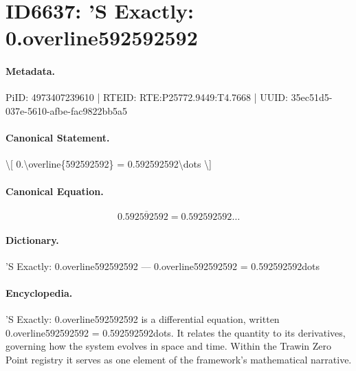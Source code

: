 \section*{ID6637: ’S Exactly: 0.overline592592592}
\paragraph{Metadata.}
PiID: 4973407239610 | RTEID: RTE:P25772.9449:T4.7668 | UUID: 35ec51d5-037e-5610-afbe-fac9822bb5a5

\paragraph{Canonical Statement.}
\textbackslash{}[ 0.\textbackslash{}overline\{592592592\} = 0.592592592\textbackslash{}dots \textbackslash{}]

\paragraph{Canonical Equation.}
\[
0.\overline{592592592} = 0.592592592\dots
\]

\paragraph{Dictionary.}
’S Exactly: 0.overline592592592 — 0.overline592592592 = 0.592592592dots

\paragraph{Encyclopedia.}
’S Exactly: 0.overline592592592 is a differential equation, written 0.overline592592592 = 0.592592592dots. It relates the quantity to its derivatives, governing how the system evolves in space and time. Within the Trawin Zero Point registry it serves as one element of the framework's mathematical narrative.
